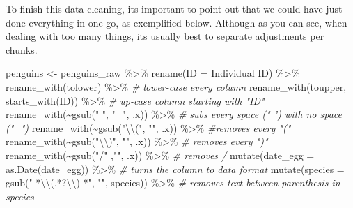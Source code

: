 \documentclass[
]{book}
\newenvironment{Shaded}{\begin{snugshade}}{\end{snugshade}}
\newcommand{\AttributeTok}[1]{\textcolor[rgb]{0.77,0.63,0.00}{#1}}
\newcommand{\CommentTok}[1]{\textcolor[rgb]{0.56,0.35,0.01}{\textit{#1}}}
\newcommand{\FunctionTok}[1]{\textcolor[rgb]{0.00,0.00,0.00}{#1}}
\newcommand{\NormalTok}[1]{#1}
\newcommand{\OtherTok}[1]{\textcolor[rgb]{0.56,0.35,0.01}{#1}}
\newcommand{\SpecialCharTok}[1]{\textcolor[rgb]{0.00,0.00,0.00}{#1}}
\newcommand{\StringTok}[1]{\textcolor[rgb]{0.31,0.60,0.02}{#1}}
\begin{document}
To finish this data cleaning, its important to point out that we could have just done everything in one go, as exemplified below.
Although as you can see, when dealing with too many things, its usually best to separate adjustments per chunks.

\begin{Shaded}
\begin{Highlighting}[]
\NormalTok{penguins }\OtherTok{\textless{}{-}}\NormalTok{ penguins\_raw }\SpecialCharTok{\%\textgreater{}\%}
  \FunctionTok{rename}\NormalTok{(}\StringTok{\textquotesingle{}ID\textquotesingle{}} \OtherTok{=} \StringTok{\textquotesingle{}Individual ID\textquotesingle{}}\NormalTok{) }\SpecialCharTok{\%\textgreater{}\%} 
  \FunctionTok{rename\_with}\NormalTok{(tolower) }\SpecialCharTok{\%\textgreater{}\%}  \CommentTok{\# lower{-}case every column}
  \FunctionTok{rename\_with}\NormalTok{(toupper, }\FunctionTok{starts\_with}\NormalTok{(}\StringTok{\textquotesingle{}ID\textquotesingle{}}\NormalTok{)) }\SpecialCharTok{\%\textgreater{}\%} \CommentTok{\# up{-}case column starting with "ID"}
  \FunctionTok{rename\_with}\NormalTok{(}\SpecialCharTok{\textasciitilde{}}\FunctionTok{gsub}\NormalTok{(}\StringTok{" "}\NormalTok{, }\StringTok{"\_"}\NormalTok{, .x))  }\SpecialCharTok{\%\textgreater{}\%} \CommentTok{\# subs every space (" ") with no space ("\_")}
  \FunctionTok{rename\_with}\NormalTok{(}\SpecialCharTok{\textasciitilde{}}\FunctionTok{gsub}\NormalTok{(}\StringTok{"}\SpecialCharTok{\textbackslash{}\textbackslash{}}\StringTok{("}\NormalTok{, }\StringTok{""}\NormalTok{, .x)) }\SpecialCharTok{\%\textgreater{}\%}  \CommentTok{\#removes every "("}
  \FunctionTok{rename\_with}\NormalTok{(}\SpecialCharTok{\textasciitilde{}}\FunctionTok{gsub}\NormalTok{(}\StringTok{"}\SpecialCharTok{\textbackslash{}\textbackslash{}}\StringTok{)"}\NormalTok{, }\StringTok{""}\NormalTok{, .x))  }\SpecialCharTok{\%\textgreater{}\%} \CommentTok{\# removes every ")"}
  \FunctionTok{rename\_with}\NormalTok{(}\SpecialCharTok{\textasciitilde{}}\FunctionTok{gsub}\NormalTok{(}\StringTok{"/"}\NormalTok{ ,}\StringTok{""}\NormalTok{, .x)) }\SpecialCharTok{\%\textgreater{}\%} \CommentTok{\# removes /}
  \FunctionTok{mutate}\NormalTok{(}\AttributeTok{date\_egg =} \FunctionTok{as.Date}\NormalTok{(date\_egg)) }\SpecialCharTok{\%\textgreater{}\%}  \CommentTok{\# turns the column to data format}
  \FunctionTok{mutate}\NormalTok{(}\AttributeTok{species =} \FunctionTok{gsub}\NormalTok{(}\StringTok{" *}\SpecialCharTok{\textbackslash{}\textbackslash{}}\StringTok{(.*?}\SpecialCharTok{\textbackslash{}\textbackslash{}}\StringTok{) *"}\NormalTok{, }\StringTok{""}\NormalTok{, species)) }\SpecialCharTok{\%\textgreater{}\%} \CommentTok{\# removes text between parenthesis in species}

\end{Highlighting}
\end{Shaded}
\end{document}
